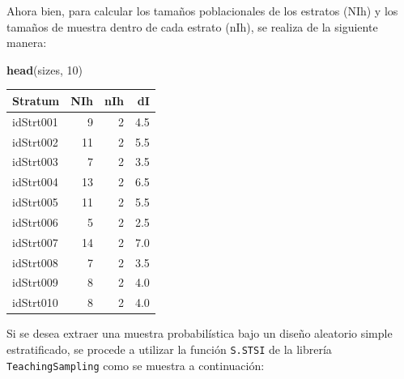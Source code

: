 \documentclass[
  12pt,
]{book}
\newenvironment{Shaded}{\begin{snugshade}}{\end{snugshade}}
\newcommand{\AttributeTok}[1]{\textcolor[rgb]{0.13,0.29,0.53}{#1}}
\newcommand{\DecValTok}[1]{\textcolor[rgb]{0.00,0.00,0.81}{#1}}
\newcommand{\FunctionTok}[1]{\textcolor[rgb]{0.13,0.29,0.53}{\textbf{#1}}}
\newcommand{\NormalTok}[1]{#1}
\newcommand{\OtherTok}[1]{\textcolor[rgb]{0.56,0.35,0.01}{#1}}
\newcommand{\SpecialCharTok}[1]{\textcolor[rgb]{0.81,0.36,0.00}{\textbf{#1}}}
\begin{document}
Ahora bien, para calcular los tamaños poblacionales de los estratos (NIh) y los tamaños de muestra dentro de cada estrato (nIh), se realiza de la siguiente manera:

\begin{Shaded}
\end{Shaded}

\begin{Shaded}
\begin{Highlighting}[]
\FunctionTok{head}\NormalTok{(sizes, }\DecValTok{10}\NormalTok{)}
\end{Highlighting}
\end{Shaded}

\begin{tabular}{l|r|r|r}
\hline
Stratum & NIh & nIh & dI\\
\hline
idStrt001 & 9 & 2 & 4.5\\
\hline
idStrt002 & 11 & 2 & 5.5\\
\hline
idStrt003 & 7 & 2 & 3.5\\
\hline
idStrt004 & 13 & 2 & 6.5\\
\hline
idStrt005 & 11 & 2 & 5.5\\
\hline
idStrt006 & 5 & 2 & 2.5\\
\hline
idStrt007 & 14 & 2 & 7.0\\
\hline
idStrt008 & 7 & 2 & 3.5\\
\hline
idStrt009 & 8 & 2 & 4.0\\
\hline
idStrt010 & 8 & 2 & 4.0\\
\hline
\end{tabular}

Si se desea extraer una muestra probabilística bajo un diseño aleatorio simple estratificado, se procede a utilizar la función \texttt{S.STSI} de la librería \texttt{TeachingSampling} como se muestra a continuación:
\end{document}

